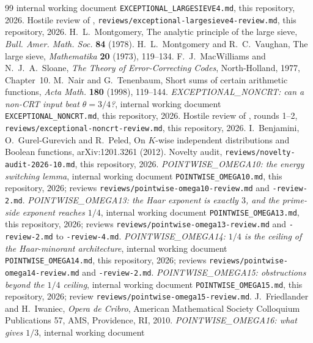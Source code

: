 \documentclass[10pt,reqno]{amsart}
\theoremstyle{definition}
\theoremstyle{remark}
\begin{document}
\begin{thebibliography}{99}
internal working document \texttt{EXCEPTIONAL\_LARGESIEVE4.md}, this
repository, 2026.
Hostile review of \cite{LS4}, \texttt{reviews/exceptional-largesieve4-review.md},
this repository, 2026.
H.~L.~Montgomery, The analytic principle of the large sieve,
\emph{Bull. Amer. Math. Soc.} \textbf{84} (1978).
H.~L.~Montgomery and R.~C.~Vaughan, The large sieve, \emph{Mathematika}
\textbf{20} (1973), 119--134.
F.~J.~MacWilliams and N.~J.~A.~Sloane, \emph{The Theory of
Error-Correcting Codes}, North-Holland, 1977, Chapter~10.
M.~Nair and G.~Tenenbaum, Short sums of certain arithmetic functions,
\emph{Acta Math.} \textbf{180} (1998), 119--144.
\emph{EXCEPTIONAL\_NONCRT: can a non-CRT input beat $\theta=3/4$?},
internal working document \texttt{EXCEPTIONAL\_NONCRT.md}, this
repository, 2026.
Hostile review of \cite{NC}, rounds 1--2,
\texttt{reviews/exceptional-noncrt-review.md}, this repository, 2026.
I.~Benjamini, O.~Gurel-Gurevich and R.~Peled, On $K$-wise independent
distributions and Boolean functions, arXiv:1201.3261 (2012).
Novelty audit, \texttt{reviews/novelty-audit-2026-10.md}, this repository,
2026.
\emph{POINTWISE\_OMEGA10: the energy switching lemma}, internal working
document \texttt{POINTWISE\_OMEGA10.md}, this repository, 2026; reviews
\texttt{reviews/pointwise-omega10-review.md} and \texttt{-review-2.md}.
\emph{POINTWISE\_OMEGA13: the Haar exponent is exactly $3$, and the
prime-side exponent reaches $1/4$}, internal working document
\texttt{POINTWISE\_OMEGA13.md}, this repository, 2026; reviews
\texttt{reviews/pointwise-omega13-review.md} and \texttt{-review-2.md} to
\texttt{-review-4.md}.
\emph{POINTWISE\_OMEGA14: $1/4$ is the ceiling of the Haar-minorant
architecture}, internal working document \texttt{POINTWISE\_OMEGA14.md},
this repository, 2026; reviews \texttt{reviews/pointwise-omega14-review.md}
and \texttt{-review-2.md}.
\emph{POINTWISE\_OMEGA15: obstructions beyond the $1/4$ ceiling}, internal
working document \texttt{POINTWISE\_OMEGA15.md}, this repository, 2026; review
\texttt{reviews/pointwise-omega15-review.md}.
J.~Friedlander and H.~Iwaniec, \emph{Opera de Cribro}, American
Mathematical Society Colloquium Publications 57, AMS, Providence, RI, 2010.
\emph{POINTWISE\_OMEGA16: what gives $1/3$}, internal working document

\end{thebibliography}
\end{document}
